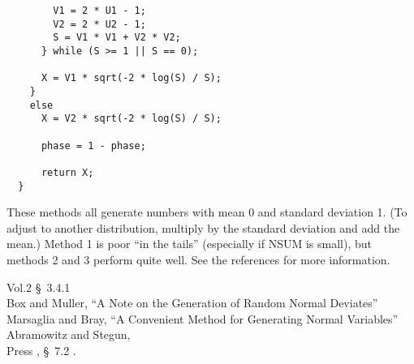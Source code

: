 \begin{faq}
\begin{itemize}
\begin{verbatim}
        V1 = 2 * U1 - 1;
        V2 = 2 * U2 - 1;
        S = V1 * V1 + V2 * V2;
      } while (S >= 1 || S == 0);

      X = V1 * sqrt(-2 * log(S) / S);
    }
    else
      X = V2 * sqrt(-2 * log(S) / S);

      phase = 1 - phase;

      return X;
  }
\end{verbatim}
	\end{itemize}
	These methods all generate numbers with mean 0 and standard deviation
        1.  (To adjust to another distribution, multiply by the standard
        deviation and add the mean.)  Method 1 is poor ``in the tails''
        (especially if NSUM is small), but methods 2 and 3 perform quite well.
        See the references for more information.

\R
	\cite{knuth} Vol.2 \S\ 3.4.1  \\
        Box and Muller, 
        ``A Note on the Generation of Random Normal Deviates'' \\
        Marsaglia and Bray, 
        ``A Convenient Method for Generating Normal Variables'' \\
        Abramowitz and Stegun,  \\
        Press ,  \S\ 7.2 .
\end{faq}


